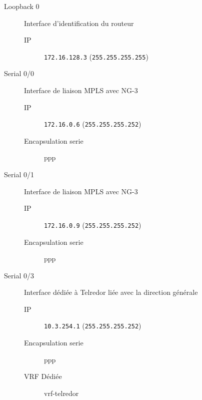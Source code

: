 	\begin{description}
		\item[Loopback 0] Interface d'identification du routeur
		\begin{description}
			\item[IP] \texttt{172.16.128.3} (\texttt{255.255.255.255})
		\end{description}

		\item[Serial 0/0] Interface de liaison MPLS avec NG-3
		\begin{description}
			\item[IP] \texttt{172.16.0.6} (\texttt{255.255.255.252})
			\item[Encapsulation serie] ppp
		\end{description}

		\item[Serial 0/1] Interface de liaison MPLS avec NG-3
		\begin{description}
			\item[IP] \texttt{172.16.0.9} (\texttt{255.255.255.252})
			\item[Encapsulation serie] ppp
		\end{description}

		\item[Serial 0/3] Interface dédiée à Telredor liée avec la direction générale
		\begin{description}
			\item[IP] \texttt{10.3.254.1} (\texttt{255.255.255.252})
			\item[Encapsulation serie] ppp
			\item[VRF Dédiée] vrf-telredor
		\end{description}

	\end{description}
	
	\clearpage
